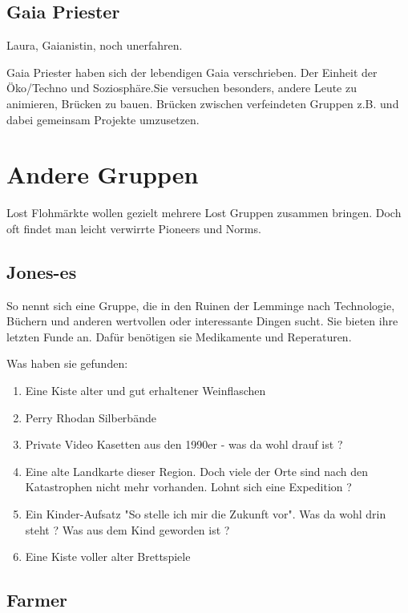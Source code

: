 \documentclass{book}
\begin{document}
\section{Gaia Priester}

Laura, Gaianistin, noch unerfahren.

Gaia Priester haben sich der lebendigen Gaia verschrieben. Der Einheit der Öko/Techno und Soziosphäre.Sie versuchen besonders, andere Leute zu animieren,  Brücken zu bauen. Brücken zwischen verfeindeten Gruppen z.B. und dabei gemeinsam Projekte umzusetzen.


\chapter{Andere Gruppen}

Lost Flohmärkte wollen gezielt mehrere Lost Gruppen zusammen bringen. Doch oft findet man leicht verwirrte Pioneers und Norms.

\section{Jones-es}

So nennt sich eine Gruppe, die in den Ruinen der Lemminge nach Technologie, Büchern und anderen wertvollen oder interessante Dingen sucht. Sie bieten ihre letzten Funde an. Dafür benötigen sie Medikamente und Reperaturen.

Was haben sie gefunden:

\begin{enumerate}
    \item Eine Kiste alter und gut erhaltener Weinflaschen
    \item Perry Rhodan Silberbände
    \item Private Video Kasetten aus den 1990er - was da wohl drauf ist ?
    \item Eine alte Landkarte dieser Region. Doch viele der Orte sind nach den Katastrophen nicht mehr vorhanden. Lohnt sich eine Expedition ?
    \item Ein Kinder-Aufsatz "So stelle ich mir die Zukunft vor". Was da wohl drin steht ? Was aus dem Kind geworden ist ?
    \item Eine Kiste voller alter Brettspiele
\end{enumerate}

\section{Farmer}
\end{document}
